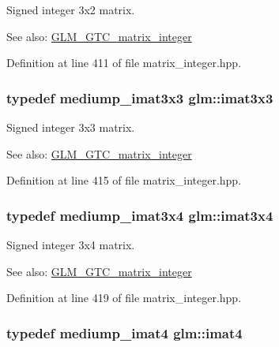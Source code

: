Signed integer 3x2 matrix. \begin{Desc}
\item[See also:]\hyperlink{group__gtc__matrix__integer}{GLM\_\-GTC\_\-matrix\_\-integer} \end{Desc}


Definition at line 411 of file matrix\_\-integer.hpp.\hypertarget{group__gtc__matrix__integer_geff9ef8f56cccc828d6b897923e75402}{
\subsubsection[imat3x3]{\setlength{\rightskip}{0pt plus 5cm}typedef mediump\_\-imat3x3 {\bf glm::imat3x3}}}
\label{group__gtc__matrix__integer_geff9ef8f56cccc828d6b897923e75402}


Signed integer 3x3 matrix. \begin{Desc}
\item[See also:]\hyperlink{group__gtc__matrix__integer}{GLM\_\-GTC\_\-matrix\_\-integer} \end{Desc}


Definition at line 415 of file matrix\_\-integer.hpp.\hypertarget{group__gtc__matrix__integer_gee5507e6cbbdd05841a0c174e60dd036}{
\subsubsection[imat3x4]{\setlength{\rightskip}{0pt plus 5cm}typedef mediump\_\-imat3x4 {\bf glm::imat3x4}}}
\label{group__gtc__matrix__integer_gee5507e6cbbdd05841a0c174e60dd036}


Signed integer 3x4 matrix. \begin{Desc}
\item[See also:]\hyperlink{group__gtc__matrix__integer}{GLM\_\-GTC\_\-matrix\_\-integer} \end{Desc}


Definition at line 419 of file matrix\_\-integer.hpp.\hypertarget{group__gtc__matrix__integer_g40fc5c5e0b07543497aa1c314891544a}{
\subsubsection[imat4]{\setlength{\rightskip}{0pt plus 5cm}typedef mediump\_\-imat4 {\bf glm::imat4}}}
\label{group__gtc__matrix__integer_g40fc5c5e0b07543497aa1c314891544a}


